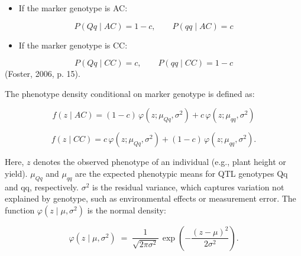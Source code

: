 \documentclass[
  letterpaper,
  DIV=11,
  numbers=noendperiod]{scrartcl}
\providecommand{\tightlist}{%
  \setlength{\itemsep}{0pt}\setlength{\parskip}{0pt}}
\begin{document}
\begin{itemize}
\tightlist
\item
  If the marker genotype is AC:
\end{itemize}

\[
P(Qq \mid AC) = 1-c, \qquad P(qq \mid AC) = c
\]

\begin{itemize}
\tightlist
\item
  If the marker genotype is CC:
\end{itemize}

\[
P(Qq \mid CC) = c, \qquad P(qq \mid CC) = 1-c
\] (Foster, 2006, p. 15).

\begin{figure}


\caption{\label{fig-2}}

\end{figure}%

The phenotype density conditional on marker genotype is defined as:

\[
f(z \mid AC) = (1-c)\,\varphi\!\left(z;\mu_{Qq},\sigma^2\right) + c\,\varphi\!\left(z;\mu_{qq},\sigma^2\right)
\]

\[
f(z \mid CC) = c\,\varphi\!\left(z;\mu_{Qq},\sigma^2\right) + (1-c)\,\varphi\!\left(z;\mu_{qq},\sigma^2\right).
\]

Here, \(z\) denotes the observed phenotype of an individual (e.g., plant
height or yield). \(\mu_{Qq}\) and \(\mu_{qq}\) are the expected
phenotypic means for QTL genotypes Qq and qq, respectively. \(\sigma^2\)
is the residual variance, which captures variation not explained by
genotype, such as environmental effects or measurement error. The
function \(\varphi(z \mid \mu,\sigma^2)\) is the normal density:

\[
\varphi(z \mid \mu,\sigma^2) \;=\; \frac{1}{\sqrt{2\pi\sigma^2}}\,
\exp\!\left(-\frac{(z-\mu)^2}{2\sigma^2}\right).
\]
\end{document}
